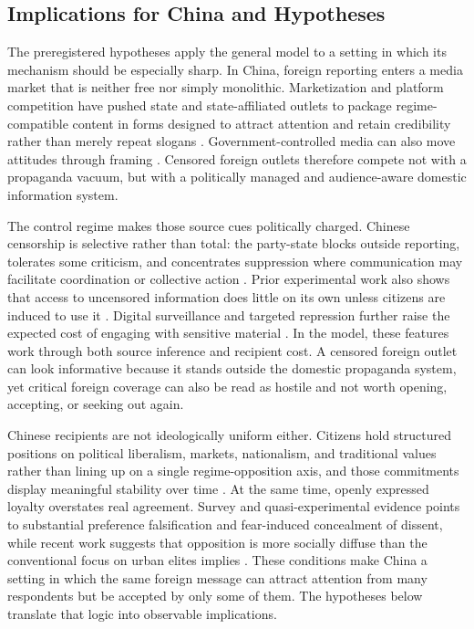 \documentclass[12pt,american]{article}
\begin{document}
	\subsection*{Implications for China and Hypotheses}
	
	The preregistered hypotheses apply the general model to a setting in which its mechanism should be especially sharp. In China, foreign reporting enters a media market that is neither free nor simply monolithic. Marketization and platform competition have pushed state and state-affiliated outlets to package regime-compatible content in forms designed to attract attention and retain credibility rather than merely repeat slogans \citep{StockmannGallagher2011,stockmann2013,LuPan2021,Wang2024Propaganda}. Government-controlled media can also move attitudes through framing \citep{panshaoxu2021}. Censored foreign outlets therefore compete not with a propaganda vacuum, but with a politically managed and audience-aware domestic information system.
	
	The control regime makes those source cues politically charged. Chinese censorship is selective rather than total: the party-state blocks outside reporting, tolerates some criticism, and concentrates suppression where communication may facilitate coordination or collective action \citep{kingpanroberts2013,roberts2018}. Prior experimental work also shows that access to uncensored information does little on its own unless citizens are induced to use it \citep{chenyang2019}. Digital surveillance and targeted repression further raise the expected cost of engaging with sensitive material \citep{QinStrombergWu2017,Xu2021,HRW2025China}. In the model, these features work through both source inference and recipient cost. A censored foreign outlet can look informative because it stands outside the domestic propaganda system, yet critical foreign coverage can also be read as hostile and not worth opening, accepting, or seeking out again.
	
	Chinese recipients are not ideologically uniform either. Citizens hold structured positions on political liberalism, markets, nationalism, and traditional values rather than lining up on a single regime-opposition axis, and those commitments display meaningful stability over time \citep{PanXu2017,PanXu2020}. At the same time, openly expressed loyalty overstates real agreement. Survey and quasi-experimental evidence points to substantial preference falsification and fear-induced concealment of dissent, while recent work suggests that opposition is more socially diffuse than the conventional focus on urban elites implies \citep{JiangYang2016,CarterCarterSchick2024}. These conditions make China a setting in which the same foreign message can attract attention from many respondents but be accepted by only some of them. The hypotheses below translate that logic into observable implications.
	
\end{document}
